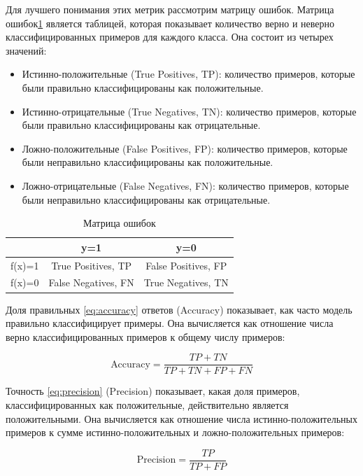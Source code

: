 \documentclass[PI, VKR]{HSEUniversity}
\begin{document}
Для лучшего понимания этих метрик рассмотрим матрицу ошибок. Матрица ошибок\ref{tbl:confusion_matrix} является таблицей, которая показывает количество верно и неверно классифицированных примеров для каждого класса. Она состоит из четырех значений:
\begin{itemize}
\item Истинно-положительные (True Positives, TP): количество примеров, которые были правильно классифицированы как положительные.
\item Истинно-отрицательные (True Negatives, TN): количество примеров, которые были правильно классифицированы как отрицательные.
\item Ложно-положительные (False Positives, FP): количество примеров, которые были неправильно классифицированы как положительные.
\item Ложно-отрицательные (False Negatives, FN): количество примеров, которые были неправильно классифицированы как отрицательные.
\end{itemize}

\begin{table}[h!]
\caption{\label{tbl:confusion_matrix}Матрица ошибок}
\centering
\begin{tabular}{|c|c|c|}
\hline
 & y=1 & y=0\\[0pt]
\hline
f(x)=1 & True Positives, TP & False Positives, FP\\[0pt]
\hline
f(x)=0 & False Negatives, FN & True Negatives, TN\\[0pt]
\hline
\end{tabular}
\end{table}

Доля правильных \ref{eq:accuracy} ответов (Accuracy) показывает, как часто модель правильно классифицирует примеры. Она вычисляется как отношение числа верно классифицированных примеров к общему числу примеров:

\begin{equation}
\label{eq:accuracy}
\text{{Accuracy}} = \frac{{TP + TN}}{{TP + TN + FP + FN}}
\end{equation}

Точность \ref{eq:precision} (Precision) показывает, какая доля примеров, классифицированных как положительные, действительно является положительными. Она вычисляется как отношение числа истинно-положительных примеров к сумме истинно-положительных и ложно-положительных примеров:

\begin{equation}
\label{eq:precision}
\text{{Precision}} = \frac{{TP}}{{TP + FP}}
\end{equation}
\end{document}
